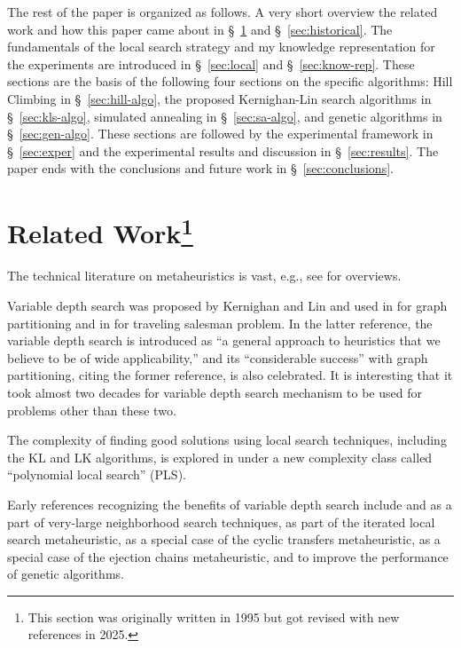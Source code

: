 \documentclass{article}
\begin{document}
The rest of the paper is organized as follows. A very short overview
the related work and how this paper came about in \S~\ref{sec:related}
and \S~\ref{sec:historical}. The fundamentals of the local search
strategy and my knowledge representation for the experiments are
introduced in \S~\ref{sec:local} and \S~\ref{sec:know-rep}. These
sections are the basis of the following four sections on the specific
algorithms: Hill Climbing in \S~\ref{sec:hill-algo}, the proposed
Kernighan-Lin search algorithms in \S~\ref{sec:kls-algo}, simulated
annealing in \S~\ref{sec:sa-algo}, and genetic algorithms in
\S~\ref{sec:gen-algo}. These sections are followed by the experimental
framework in \S~\ref{sec:exper} and the experimental results and
discussion in \S~\ref{sec:results}. The paper ends with the
conclusions and future work in \S~\ref{sec:conclusions}.

\section{Related Work\protect\footnote{This section was originally written in
  1995 but got revised with new references in 2025.}}
\label{sec:related}

The technical literature on metaheuristics is vast, e.g., see
\cite{AhErOr02,LoMaSt02,MaPaRe18,PiRo10,SoSeGl18,Wi20} for
overviews.

Variable depth search was proposed by Kernighan and Lin and used in
\cite{KeLi70} for graph partitioning and in \cite{LiKe73} for
traveling salesman problem. In the latter reference, the variable
depth search is introduced as ``a general approach to heuristics that
we believe to be of wide applicability,'' and its ``considerable
success'' with graph partitioning, citing the former reference, is
also celebrated. It is interesting that it took almost two decades for
variable depth search mechanism to be used for problems other than
these two.

The complexity of finding good solutions using local search
techniques, including the KL and LK algorithms, is explored in
\cite{JoPaYa88,PaScYa90} under a new complexity class called
``polynomial local search'' (PLS).

Early references recognizing the benefits of variable depth search
include \cite{AhErOr02} and \cite{PiRo10} as a part of very-large
neighborhood search techniques, \cite{LoMaSt01} as part of the
iterated local search metaheuristic, \cite{ThOr89} as a special case
of the cyclic transfers metaheuristic, \cite{Gl96} as a special case
of the ejection chains metaheuristic, \cite{Gr03} and \cite{MeFr02} to
improve the performance of genetic algorithms.
\end{document}
